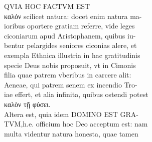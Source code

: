\documentclass{article}
\begin{document}
\begin{pages}
                QVIA HOC FACTVM EST \\
                καλόν scilicet natura: docet enim natura ma- \\
                ioribus oportere gratiam referre, vide leges \\
                ciconiarum apud Aristophanem, quibus iu- \\
                bentur pelargides seniores ciconias alere, et \\
                exempla Ethnica illustria in hac gratitudinis \\
                specie Deus nobis proposuit, vt in Cimonis \\
                filia quae patrem vberibus in carcere alit: \\
                Aeneae, qui patrem senem ex incendio Tro- \\
                iae effert, et alia infinita, quibus ostendi potest \\
                καλὸν τῇ φύσει. \\
                Altera est, quia idem DOMINO EST GRA- \\
                TVM,h.e. officium hoc Deo acceptum est: nam \\
                multa videntur natura honesta, quae tamen \\
                

\end{pages}
\end{document}
